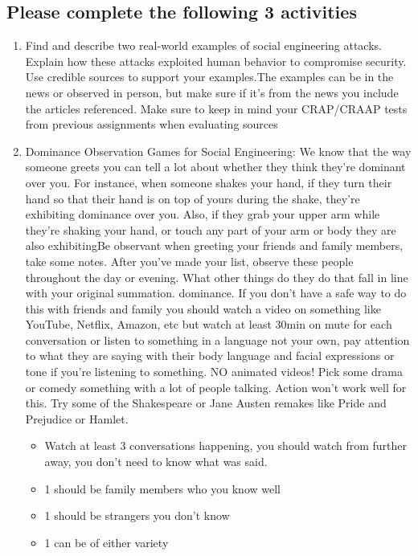 \documentclass[12pt]{article}
\begin{document}
\subsection*{Please complete the following 3 activities}
    \begin{enumerate}
        \item Find and describe two real-world examples of social engineering attacks. Explain how these attacks exploited human behavior to compromise security. Use credible sources to support your examples.The examples can be in the news or observed in person, but make sure if it's from the news you include the articles referenced. Make sure to keep in mind your CRAP/CRAAP tests from previous assignments when evaluating sources
        \item Dominance Observation Games for Social Engineering: We know that the way someone greets you can tell a lot about whether they think they're dominant over you. For instance, when someone shakes your hand, if they turn their hand so that their hand is on top of yours during the shake, they're exhibiting dominance over you. Also, if they grab your upper arm while they're shaking your hand, or touch any part of your arm or body they are also exhibitingBe observant when greeting your friends and family members, take some notes. After you've made your list, observe these people throughout the day or evening. What other things do they do that fall in line with your original summation. dominance. If you don't have a safe way to do this with friends and family you should watch a video on something like YouTube, Netflix, Amazon, etc but watch at least 30min on mute for each conversation or listen to something in a language not your own, pay attention to what they are saying with their body language and facial expressions or tone if you're listening to something.   NO animated videos!  Pick some drama or comedy something with a lot of people talking.  Action won't work well for this. Try some of the Shakespeare or Jane Austen remakes like Pride and Prejudice or Hamlet. 
        \begin{itemize}
            \item Watch at least 3 conversations happening, you should watch from further away, you don't need to know what was said.
            \item 1 should be family members who you know well
            \item 1 should be strangers you don't know
            \item 1 can be of either variety

\end{itemize}
\end{enumerate}
\end{document}
